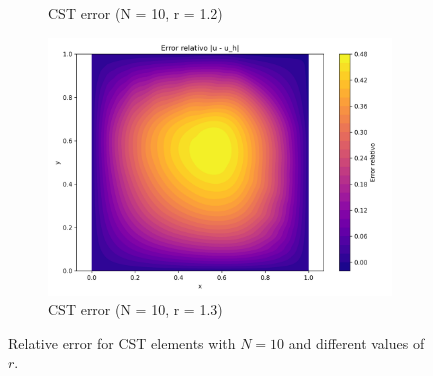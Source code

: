 \documentclass[12pt]{article}
\begin{document}
\begin{figure}[H]
\begin{subfigure}[t]{0.32\textwidth}
        \caption{CST error (N = 10, r = 1.2)}
        \label{fig:cst_error_r1.2}
    \end{subfigure}
    \hfill
    \begin{subfigure}[t]{0.32\textwidth}
        \centering
        \includegraphics[width=\textwidth]{Graficos/13/CST_relative_error_colormap.png}
        \caption{CST error (N = 10, r = 1.3)}
        \label{fig:cst_error_r1.3}
    \end{subfigure}
    \caption{Relative error for CST elements with $N = 10$ and different values of $r$.}
    \label{fig:cst_error_comparison}
\end{figure}
\end{document}
